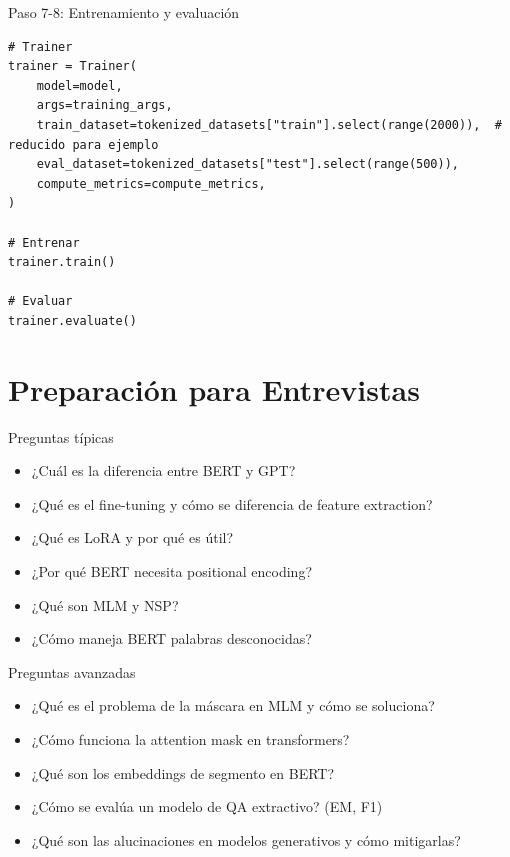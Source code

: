 \documentclass[aspectratio=169, 10pt, xcolor=table]{beamer}
\begin{document}
\begin{frame}[fragile]{Paso 7-8: Entrenamiento y evaluación}
    \begin{lstlisting}
# Trainer
trainer = Trainer(
    model=model,
    args=training_args,
    train_dataset=tokenized_datasets["train"].select(range(2000)),  # reducido para ejemplo
    eval_dataset=tokenized_datasets["test"].select(range(500)),
    compute_metrics=compute_metrics,
)

# Entrenar
trainer.train()

# Evaluar
trainer.evaluate()
    \end{lstlisting}
\end{frame}

\section{Preparación para Entrevistas}

\begin{frame}{Preguntas típicas}
    \begin{itemize}
        \item ¿Cuál es la diferencia entre BERT y GPT?
        \item ¿Qué es el fine-tuning y cómo se diferencia de feature extraction?
        \item ¿Qué es LoRA y por qué es útil?
        \item ¿Por qué BERT necesita positional encoding?
        \item ¿Qué son MLM y NSP?
        \item ¿Cómo maneja BERT palabras desconocidas?
    \end{itemize}
\end{frame}

\begin{frame}{Preguntas avanzadas}
    \begin{itemize}
        \item ¿Qué es el problema de la máscara en MLM y cómo se soluciona?
        \item ¿Cómo funciona la attention mask en transformers?
        \item ¿Qué son los embeddings de segmento en BERT?
        \item ¿Cómo se evalúa un modelo de QA extractivo? (EM, F1)
        \item ¿Qué son las alucinaciones en modelos generativos y cómo mitigarlas?
    \end{itemize}
\end{frame}
\end{document}
